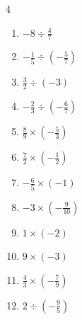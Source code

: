 \begin{multicols}{4}
\begin{enumerate}
  \item $\displaystyle -8\div{}\frac{4}{7}$

        \phantom{$\displaystyle =-14$}

  \item $\displaystyle -\frac{1}{5}\div{}\left(-\frac{5}{7}\right)$


  \item $\displaystyle \frac{3}{2}\div{}\left(-3\right)$


  \item $\displaystyle -\frac{2}{3}\div{}\left(-\frac{6}{7}\right)$


  \item $\displaystyle \frac{8}{9}\times{}\left(-\frac{5}{3}\right)$


  \item $\displaystyle \frac{7}{2}\times{}\left(-\frac{1}{2}\right)$


\columnbreak %

  \item $\displaystyle -\frac{6}{5}\times{}\left(-1\right)$


  \item $\displaystyle -3\times{}\left(-\frac{9}{10}\right)$


  \item $\displaystyle 1\times{}\left(-2\right)$

        \phantom{$\displaystyle =-2$}

  \item $\displaystyle 9\times{}\left(-3\right)$

        \phantom{$\displaystyle =-27$}

  \item $\displaystyle \frac{4}{3}\times{}\left(-\frac{7}{9}\right)$


  \item $\displaystyle 2\div{}\left(-\frac{9}{5}\right)$


\end{enumerate}
\end{multicols}
